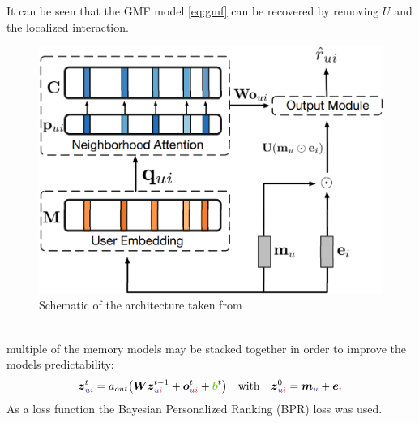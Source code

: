 It can be seen that the GMF model \cref{eq:gmf} can be recovered by removing $U$ and the localized interaction.
\begin{figure}[h]
  \centering
  \includegraphics[width=0.7\linewidth]{figures/CMN.png}
  \caption{Schematic of the architecture taken from \cite{he2017neural}}
  \label{fig:}
\end{figure}\\
multiple of the memory models may be stacked together in order to improve the models predictability:
\begin{align}
  \vec{z}_{\idxu\idxi}^{t}=a_{out}\big(\vec{W}\vec{z}_{\idxu\idxi}^{t-1}+\vec{o}_{\idxu\idxi}^{t}
  +\vec{\mcb}^{t}\big)&&\text{with}&&\vec{z}_{\idxu\idxi}^{0}=\vec{m}_{\idxu}+\vec{e}_{\idxi}
\end{align}
As a loss function the Bayesian Personalized Ranking (BPR) loss was used.
